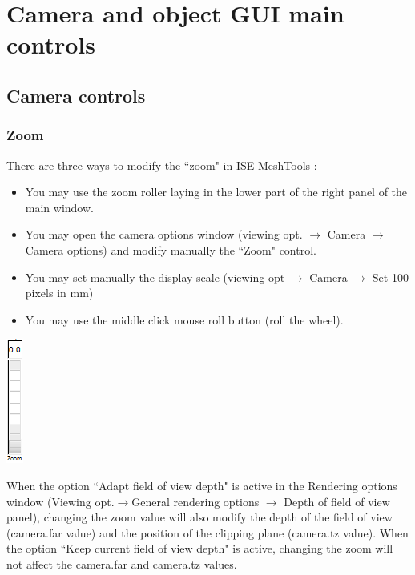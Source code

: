 \chapter{Camera and object GUI main controls}
\minitoc  

 \section{Camera controls}
\subsection{Zoom}
There are three ways to modify the ``zoom" in ISE-MeshTools :


\begin{minipage}{0.7\textwidth}
\begin{itemize}
\item You may use the zoom roller laying in the lower part of the right panel of the main window.
\item	You may open the camera options window (viewing opt. $\rightarrow$  Camera $\rightarrow$ Camera options) and modify manually the ``Zoom" control.
\item	You may set manually the display scale (viewing opt $\rightarrow$ Camera $\rightarrow$ Set 100 pixels in mm)
\item	You may use the middle click mouse roll button (roll the wheel).
\end{itemize}
\end{minipage}    
\begin{minipage}{0.25\textwidth}\centering
  \includegraphics[scale=0.5]{images/Icons/zoom_01.png}
 \end{minipage}    


When the option ``Adapt field of view depth" is active in the Rendering options window (Viewing opt.$\rightarrow$General rendering options $\rightarrow$ Depth of field of view panel), changing the zoom value will also modify the depth of the field of view (camera.far value) and the position of the clipping plane (camera.tz value). When the option ``Keep current field of view depth" is active, changing the zoom will not affect the camera.far and camera.tz values.

